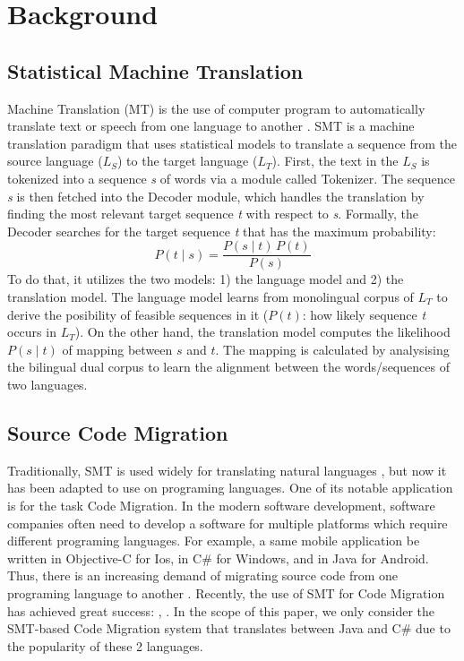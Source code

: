 \section{Background}
\subsection{Statistical Machine Translation}
Machine Translation (MT) is the use of computer program to automatically translate text or speech from one language to another \cite{MT93}. SMT is a machine translation paradigm that uses statistical models to translate a sequence from the source language ($L_S$) to the target language ($L_T$). First, the text in the $L_S$ is tokenized into a sequence \textit{s} of words via a module called Tokenizer. The sequence \textit{s} is then fetched into the Decoder module, which handles the translation by finding the most relevant target sequence \textit{t} with respect to \textit{s}. Formally, the Decoder searches for the target sequence \textit{t} that has the maximum probability:
$$ P\left(t \mid s \right) = \frac{P\left(s \mid t\right) \, P\left(t\right)}{P\left(s\right)} $$
To do that, it utilizes the two models: 1) the language model and 2) the translation model. The language model learns from monolingual corpus of $L_T$ to derive the posibility of feasible sequences in it ($P\left(t\right)$: how likely sequence \textit{t} occurs in $L_T$). On the other hand, the translation model computes the likelihood $P\left(s \mid t\right)$ of mapping between $s$ and $t$. The mapping is calculated by analysising the bilingual dual corpus to learn the alignment between the words/sequences of two languages.

\subsection{Source Code Migration}
Traditionally, SMT is used widely for translating natural languages \cite{smtbook}, but now it has been adapted to use on programing languages. One of its notable application is for the task Code Migration. In the modern software development, software companies often need to develop a software for multiple platforms which require different programing languages. For example, a same mobile application be written in Objective-C for Ios, in C\# for Windows, and in Java for Android. Thus, there is an increasing demand of migrating source code from one programing language to another \cite{Wu2010}. Recently, the use of SMT for Code Migration has achieved great success: \cite{mppSMT}, \cite{phrasalSMT}. In the scope of this paper, we only consider the SMT-based Code Migration system that translates between Java and C\# due to the popularity of these 2 languages. 


